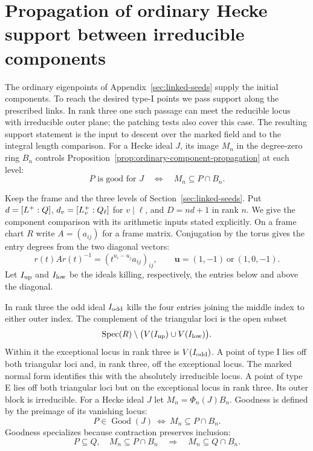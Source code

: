 \section{Propagation of ordinary Hecke support between irreducible components}
\label{sec:linked-components}
\hypertarget{source-ordinary-linked-components}{}

The ordinary eigenpoints of Appendix~\ref{sec:linked-seeds}
supply the initial components. To reach the desired type-I points we pass support along the prescribed links. In rank
three one such passage can meet the reducible locus with irreducible outer plane; the
patching tests also cover this case. The resulting support statement is the input to
descent over the marked field and to the integral length
comparison. For a Hecke ideal \(J\), its image \(M_n\) in the degree-zero ring \(B_n\) controls Proposition~\ref{prop:ordinary-component-propagation} at each level: 
\[
 P\text{ is good for }J\quad\Longleftrightarrow\quad M_n\subseteq P\cap B_n.
\]


Keep the frame and the three levels of Section~\ref{sec:linked-seeds}.
Put \(d=[L^+:Q]\), \(d_v=[L_v^+:Q_\ell]\) for \(v\mid\ell\),
and \(D=nd+1\) in rank \(n\). We give the component comparison
with its arithmetic inputs stated explicitly. On a frame chart \(R\) write \(A=(a_{ij})\) for a frame matrix. Conjugation by the
torus gives the entry degrees from the two diagonal vectors:
\[
 r(t)A r(t)^{-1}=(t^{u_i-u_j}a_{ij})_{ij},\qquad
 \mathbf u=(1,-1)\ \text{or}\ (1,0,-1).
\]
Let \(I_{\rm up}\) and \(I_{\rm low}\) be the ideals killing,
respectively, the entries below and above the diagonal.

In
rank three the odd ideal \(I_{\rm odd}\) kills the four
entries joining the middle index to either outer index.
The complement of the triangular loci is the open subset
\[
 \operatorname{Spec}(R)\setminus
              \bigl(V(I_{\rm up})\cup V(I_{\rm low})\bigr).
\]
Within it the exceptional locus in rank three is \(V(I_{\rm odd})\). A point of type I
lies off both triangular loci and, in rank three, off the
exceptional locus. The marked normal form identifies this
with the absolutely irreducible locus. A point of type E
lies off both triangular loci but on the exceptional locus
in rank three. Its outer block is irreducible. For a Hecke ideal \(J\) let \(M_n=\Phi_n(J)B_n\).
Goodness is defined by the preimage of its vanishing locus:
\[
      P\in\operatorname{Good}(J)
                  \ \Longleftrightarrow\ M_n\subseteq P\cap B_n .
\]
Goodness specializes because contraction preserves inclusion: 
\[
 P\subseteq Q,\quad M_n\subseteq P\cap B_n\quad\Longrightarrow\quad M_n\subseteq Q\cap B_n.
\]


